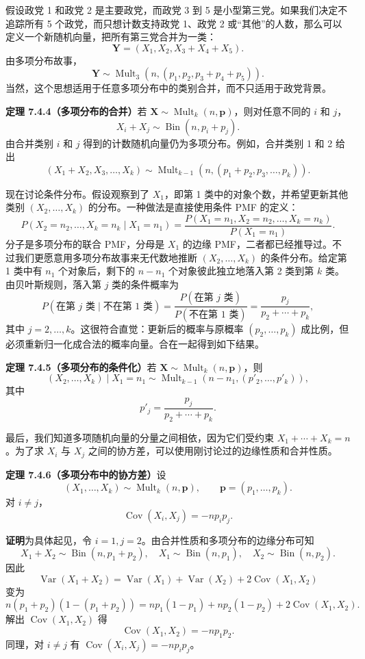 \documentclass[UTF8,12pt,a4paper,fontset=fandol]{ctexart}
\begin{document}
假设政党 1 和政党 2 是主要政党，而政党 3 到 5 是小型第三党。如果我们决定不追踪所有 5 个政党，而只想计数支持政党 1、政党 2 或“其他”的人数，那么可以定义一个新随机向量，把所有第三党合并为一类：
\[
  \mathbf{Y}=(X_1,X_2,X_3+X_4+X_5).
\]
由多项分布故事，
\[
  \mathbf{Y}\sim \operatorname{Mult}_3(n,(p_1,p_2,p_3+p_4+p_5)).
\]
当然，这个思想适用于任意多项分布中的类别合并，而不只适用于政党背景。

\noindent\textbf{定理 7.4.4（多项分布的合并）}\quad 若 $\mathbf{X}\sim \operatorname{Mult}_k(n,\mathbf{p})$，则对任意不同的 $i$ 和 $j$，
\[
  X_i+X_j\sim \operatorname{Bin}(n,p_i+p_j).
\]
由合并类别 $i$ 和 $j$ 得到的计数随机向量仍为多项分布。例如，合并类别 1 和 2 给出
\[
  (X_1+X_2,X_3,\ldots,X_k)
  \sim \operatorname{Mult}_{k-1}(n,(p_1+p_2,p_3,\ldots,p_k)).
\]

现在讨论条件分布。假设观察到了 $X_1$，即第 1 类中的对象个数，并希望更新其他类别 $(X_2,\ldots,X_k)$ 的分布。一种做法是直接使用条件 PMF 的定义：
\[
  P(X_2=n_2,\ldots,X_k=n_k\mid X_1=n_1)
  =\frac{P(X_1=n_1,X_2=n_2,\ldots,X_k=n_k)}{P(X_1=n_1)}.
\]
分子是多项分布的联合 PMF，分母是 $X_1$ 的边缘 PMF，二者都已经推导过。不过我们更愿意用多项分布故事来无代数地推断 $(X_2,\ldots,X_k)$ 的条件分布。给定第 1 类中有 $n_1$ 个对象后，剩下的 $n-n_1$ 个对象彼此独立地落入第 2 类到第 $k$ 类。由贝叶斯规则，落入第 $j$ 类的条件概率为
\[
  P(\text{在第 }j\text{ 类}\mid \text{不在第 }1\text{ 类})
  =\frac{P(\text{在第 }j\text{ 类})}{P(\text{不在第 }1\text{ 类})}
  =\frac{p_j}{p_2+\cdots+p_k},
\]
其中 $j=2,\ldots,k$。这很符合直觉：更新后的概率与原概率 $(p_2,\ldots,p_k)$ 成比例，但必须重新归一化成合法的概率向量。合在一起得到如下结果。

\noindent\textbf{定理 7.4.5（多项分布的条件化）}\quad 若 $\mathbf{X}\sim \operatorname{Mult}_k(n,\mathbf{p})$，则
\[
  (X_2,\ldots,X_k)\mid X_1=n_1
  \sim \operatorname{Mult}_{k-1}(n-n_1,(p'_2,\ldots,p'_k)),
\]
其中
\[
  p'_j=\frac{p_j}{p_2+\cdots+p_k}.
\]

最后，我们知道多项随机向量的分量之间相依，因为它们受约束 $X_1+\cdots+X_k=n$。为了求 $X_i$ 与 $X_j$ 之间的协方差，可以使用刚讨论过的边缘性质和合并性质。

\noindent\textbf{定理 7.4.6（多项分布中的协方差）}\quad 设
\[
  (X_1,\ldots,X_k)\sim \operatorname{Mult}_k(n,\mathbf{p}),
  \qquad \mathbf{p}=(p_1,\ldots,p_k).
\]
对 $i\ne j$，
\[
  \operatorname{Cov}(X_i,X_j)=-np_ip_j.
\]

\noindent\textbf{证明}\quad 为具体起见，令 $i=1,j=2$。由合并性质和多项分布的边缘分布可知
\[
  X_1+X_2\sim \operatorname{Bin}(n,p_1+p_2),\quad
  X_1\sim \operatorname{Bin}(n,p_1),\quad
  X_2\sim \operatorname{Bin}(n,p_2).
\]
因此
\[
  \operatorname{Var}(X_1+X_2)
  =\operatorname{Var}(X_1)+\operatorname{Var}(X_2)+2\operatorname{Cov}(X_1,X_2)
\]
变为
\[
  n(p_1+p_2)(1-(p_1+p_2))
  =np_1(1-p_1)+np_2(1-p_2)+2\operatorname{Cov}(X_1,X_2).
\]
解出 $\operatorname{Cov}(X_1,X_2)$ 得
\[
  \operatorname{Cov}(X_1,X_2)=-np_1p_2.
\]
同理，对 $i\ne j$ 有 $\operatorname{Cov}(X_i,X_j)=-np_ip_j$。
\end{document}
